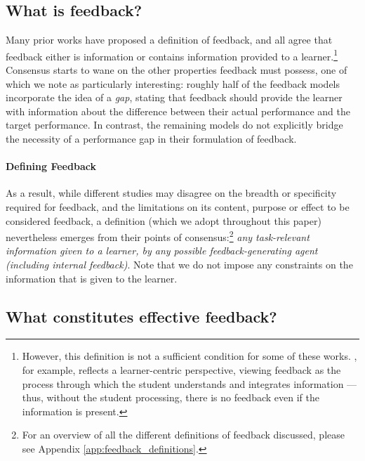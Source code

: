 \subsection{What is feedback?}

Many prior works have proposed a definition of feedback, and all agree that feedback either is information or contains information provided to a learner.\footnote{However, this definition is not a sufficient condition for some of these works. \citet{carless_development_2018}, for example, reflects a learner-centric perspective, viewing feedback as the process through which the student understands and integrates information --- thus, without the student processing, there is no feedback even if the information is present.} Consensus starts to wane on the other properties feedback must possess, one of which we note as particularly interesting: roughly half of the feedback models  \citep{ramaprasad_definition_1983, butler_feedback_1995, narciss_how_2004, narciss_feedback_2008, nicol_formative_2006, hattie_power_2007, lipnevich_review_2021, panadero_review_2022} incorporate the idea of a \textit{gap}, stating that feedback should provide the learner with information about the difference between their actual performance and the target performance. In contrast, the remaining models do not explicitly bridge the necessity of a performance gap in their formulation of feedback.


\paragraph{Defining Feedback} As a result, while different studies may disagree on the breadth or specificity required for feedback, and the limitations on its content, purpose or effect to be considered feedback, a definition (which we adopt throughout this paper) nevertheless emerges from their points of consensus:\footnote{For an overview of all the different definitions of feedback discussed, please see Appendix \ref{app:feedback_definitions}.} \textit{any task-relevant information given to a learner, by any possible feedback-generating agent (including internal feedback)}. Note that we do not impose any constraints on the information that is given to the learner.

\subsection{What constitutes effective feedback?}
\label{sec:eff-feedback}

